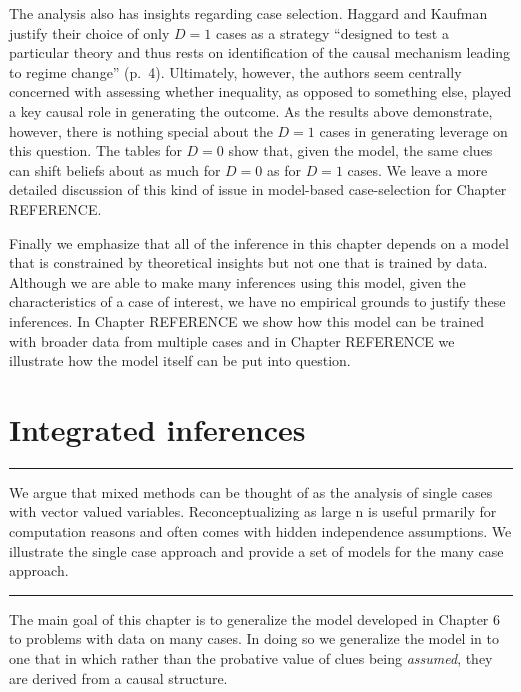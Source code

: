 \documentclass[12pt,]{book}
\begin{document}
The analysis also has insights regarding case selection. Haggard and Kaufman justify their choice of only \(D=1\) cases as a strategy ``designed to test a particular theory and thus rests on identification of the causal mechanism leading to regime change'' (p.~4). Ultimately, however, the authors seem centrally concerned with assessing whether inequality, as opposed to something else, played a key causal role in generating the outcome. As the results above demonstrate, however, there is nothing special about the \(D=1\) cases in generating leverage on this question. The tables for \(D=0\) show that, given the model, the same clues can shift beliefs about as much for \(D=0\) as for \(D=1\) cases. We leave a more detailed discussion of this kind of issue in model-based case-selection for Chapter REFERENCE.

Finally we emphasize that all of the inference in this chapter depends on a model that is constrained by theoretical insights but not one that is trained by data. Although we are able to make many inferences using this model, given the characteristics of a case of interest, we have no empirical grounds to justify these inferences. In Chapter REFERENCE we show how this model can be trained with broader data from multiple cases and in Chapter REFERENCE we illustrate how the model itself can be put into question.

\hypertarget{integrated-inferences}{%
\chapter{Integrated inferences}\label{integrated-inferences}}

\begin{center}\rule{0.5\linewidth}{\linethickness}\end{center}

We argue that mixed methods can be thought of as the analysis of single cases with vector valued variables. Reconceptualizing as large n is useful prmarily for computation reasons and often comes with hidden independence assumptions. We illustrate the single case approach and provide a set of models for the many case approach.

\begin{center}\rule{0.5\linewidth}{\linethickness}\end{center}

The main goal of this chapter is to generalize the model developed in Chapter 6 to problems with data on many cases. In doing so we generalize the model in \citet{humphreys2015mixing} to one that in which rather than the probative value of clues being \emph{assumed}, they are derived from a causal structure.
\end{document}
